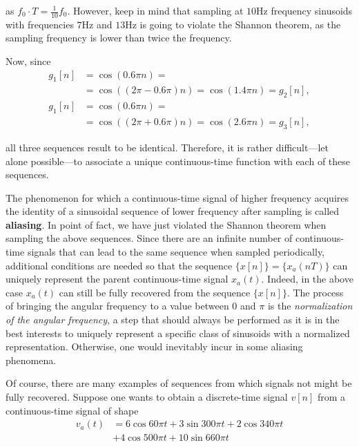 \documentclass[\documentfontsize, twocolumn]{\classname}
\begin{document}
as $f_0 \cdot T = \frac{1}{10}f_0$. However, keep in mind that sampling at $10$Hz frequency sinusoids with frequencies $7$Hz and $13$Hz is going to violate the Shannon theorem, as the sampling frequency is lower than twice the frequency.

Now, since
\begin{align*}
    g_1[n] &= \cos{(0.6\pi n)} =\\
           &= \cos{((2\pi - 0.6\pi)n)} = \cos{(1.4\pi n)} = g_2[n], \\
    g_1[n] &= \cos{(0.6\pi n)} =\\
           &= \cos{((2\pi + 0.6\pi)n)} = \cos{(2.6\pi n)} = g_3[n],
\end{align*}

all three se\-quen\-ces result to be identical. Therefore, it is rather difficult---let alone possible---to associate a unique con\-ti\-nuo\-us-time function with each of these se\-quen\-ces.

The phenomenon for which a con\-ti\-nuo\-us-time signal of high\-er frequency acquires the identity of a sinusoidal se\-quen\-ce of lower frequency after sampling is called \textbf{aliasing}. In point of fact, we have just violated the Shannon theorem when sampling the above sequences. Since there are an infinite number of con\-ti\-nuo\-us-time signals that can lead to the same se\-quen\-ce when sampled periodically, additional conditions are needed so that the se\-quen\-ce $\{x[n]\} = \{x_a(nT)\}$ can uniquely represent the parent con\-ti\-nuo\-us-time signal $x_a(t)$. Indeed, in the above case $x_a(t)$ can still be fully recovered from the se\-quen\-ce $\{x[n]\}$. The process of bringing the angular frequency to a value between $0$ and $\pi$ is the \emph{normalization of the angular frequency}, a step that should always be performed as it is in the best interests to uniquely represent a specific class of sinusoids with a normalized representation.
Otherwise, one would inevitably incur in some aliasing phenomena.

Of course, there are many examples of se\-quen\-ces from which signals not might be fully recovered. Suppose one wants to obtain a discrete-time signal $v[n]$ from a con\-ti\-nuo\-us-time signal of shape
\begin{align*}
v_a(t) &=6\cos{60\pi t} + 3\sin{300\pi t} + 2\cos{340\pi t} \\ & + 4\cos{500\pi t} + 10\sin{660\pi t}
\end{align*}
\end{document}
